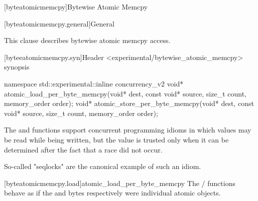 
[byteatomicmemcpy]{Bytewise Atomic Memcpy}

[byteatomicmemcpy.general]{General}

This clause describes bytewise atomic memcpy access. 


[byteeatomicmemcpy.syn]{Header <experimental/bytewise_atomic_memcpy> synopsis}

\begin{codeblock}
namespace std::experimental::inline concurrency_v2 {
  void* atomic_load_per_byte_memcpy(void* dest, const void* source, size_t count, memory_order order);
  void* atomic_store_per_byte_memcpy(void* dest, const void* source, size_t count, memory_order order);
}
\end{codeblock}

\pnum

The  and
 functions support concurrent
programming idioms in which values may be read while being written, but
the value is trusted only when it can be determined after the fact that
a race did not occur. \begin{note} So-called "seqlocks" are the canonical
example of such an idiom. \end{note}


[byteatomicmemcpy.load]{atomic_load_per_byte_memcpy}
\pnum
The  /
 functions behave as if the
 and  bytes respectively were individual
atomic objects.

\textbf{}

